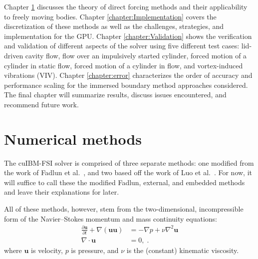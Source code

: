 Chapter \ref{chapter:Numerical Methods} discusses the theory of direct forcing methods and their applicability to freely moving bodies. 
Chapter \ref{chapter:Implementation} covers the discretization of these methods as well as the challenges, strategies, and implementation for the GPU. 
Chapter \ref{chapter:Validation} shows the verification and validation of different aspects of the solver using five different test cases: lid-driven cavity flow, flow over an impulsively started cylinder, forced motion of a cylinder in static flow, forced motion of a cylinder in flow, and vortex-induced vibrations (VIV). 
Chapter \ref{chapter:error} characterizes the order of accuracy and performance scaling for the immersed boundary method approaches considered. 
The final chapter will summarize results, discuss issues encountered, and recommend future work.

\chapter{Numerical methods}\label{chapter:Numerical Methods}
The cuIBM-FSI solver is comprised of three separate methods: 
one modified from the work of Fadlun et al.~\cite{Fadlun:2000fl}, and two based off the work of Luo et al.~\cite{Luo:2012gx}. 
For now, it will suffice to call these the modified Fadlun, external, and embedded methods and leave their explanations for later. 

All of these methods, however, stem from the two-dimensional, incompressible form of the Navier--Stokes momentum and mass continuity equations:
\begin{align}
\frac{\partial \textbf{u}}{\partial t} + \nabla ( \textbf{uu} ) &= -\nabla p + \nu\nabla^{2}\textbf{u} \label{eq:NavierStokes} \\
\nabla \cdot \textbf{u} &= 0, \label{eq:Continuity} \;.
\end{align}
where $\textbf{u}$ is velocity, $p$ is pressure, and $\nu$ is the (constant) kinematic viscosity.

